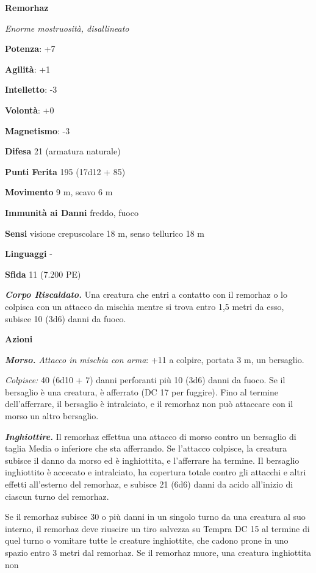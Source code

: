 \begin{multicols}{2}
\textbf{Remorhaz}

\emph{Enorme mostruosità, disallineato}

\textbf{Potenza}: +7

\textbf{Agilità}: +1

\textbf{Intelletto}: -3

\textbf{Volontà}: +0

\textbf{Magnetismo}: -3

\textbf{Difesa} 21 (armatura naturale)

\textbf{Punti Ferita} 195 (17d12 + 85)

\textbf{Movimento} 9 m, scavo 6 m

\textbf{Immunità ai Danni} freddo, fuoco

\textbf{Sensi} visione crepuscolare 18 m, senso tellurico 18 m

\textbf{Linguaggi} -

\textbf{Sfida} 11 (7.200 PE)

\emph{\textbf{Corpo Riscaldato.}} Una creatura che entri a contatto con
il remorhaz o lo colpisca con un attacco da mischia mentre si trova
entro 1,5 metri da esso, subisce 10 (3d6) danni da fuoco.

\textbf{Azioni}

\emph{\textbf{Morso.} Attacco in mischia con arma}: +11 a colpire,
portata 3 m, un bersaglio.

\emph{Colpisce:} 40 (6d10 + 7) danni perforanti più 10 (3d6) danni da
fuoco. Se il bersaglio è una creatura, è afferrato (DC 17 per fuggire).
Fino al termine dell'afferrare, il bersaglio è intralciato, e il
remorhaz non può attaccare con il morso un altro bersaglio.

\emph{\textbf{Inghiottire.}} Il remorhaz effettua una attacco di morso
contro un bersaglio di taglia Media o inferiore che sta afferrando. Se
l'attacco colpisce, la creatura subisce il danno da morso ed è
inghiottita, e l'afferrare ha termine. Il bersaglio inghiottito è
accecato e intralciato, ha copertura totale contro gli attacchi e altri
effetti all'esterno del remorhaz, e subisce 21 (6d6) danni da acido
all'inizio di ciascun turno del remorhaz.

Se il remorhaz subisce 30 o più danni in un singolo turno da una
creatura al suo interno, il remorhaz deve riuscire un tiro salvezza su Tempra DC 15 al termine di quel turno o vomitare tutte le creature
inghiottite, che cadono prone in uno spazio entro 3 metri dal remorhaz.
Se il remorhaz muore, una creatura inghiottita non



\end{multicols}
